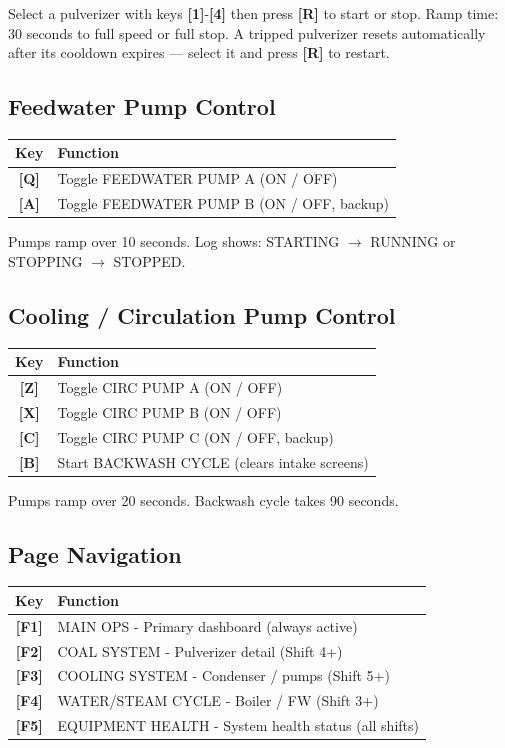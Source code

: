 \documentclass[10pt,a5paper]{article}
\newcommand{\key}[1]{\textbf{[#1]}}
\begin{document}
Select a pulverizer with keys \key{1}-\key{4} then press \key{R} to start or stop.
Ramp time: 30 seconds to full speed or full stop. A tripped pulverizer resets
automatically after its cooldown expires --- select it and press \key{R} to restart.

\subsection{Feedwater Pump Control}

\begin{center}
\begin{tabular}{cl}
\toprule
\textbf{Key} & \textbf{Function} \\
\midrule
\key{Q} & Toggle FEEDWATER PUMP A (ON / OFF) \\
\key{A} & Toggle FEEDWATER PUMP B (ON / OFF, backup) \\
\bottomrule
\end{tabular}
\end{center}

Pumps ramp over 10 seconds. Log shows: STARTING $\to$ RUNNING or STOPPING $\to$ STOPPED.

\subsection{Cooling / Circulation Pump Control}

\begin{center}
\begin{tabular}{cl}
\toprule
\textbf{Key} & \textbf{Function} \\
\midrule
\key{Z} & Toggle CIRC PUMP A (ON / OFF) \\
\key{X} & Toggle CIRC PUMP B (ON / OFF) \\
\key{C} & Toggle CIRC PUMP C (ON / OFF, backup) \\
\key{B} & Start BACKWASH CYCLE (clears intake screens) \\
\bottomrule
\end{tabular}
\end{center}

Pumps ramp over 20 seconds. Backwash cycle takes 90 seconds.

\subsection{Page Navigation}

\begin{center}
\begin{tabular}{cl}
\toprule
\textbf{Key} & \textbf{Function} \\
\midrule
\key{F1} & MAIN OPS - Primary dashboard (always active) \\
\key{F2} & COAL SYSTEM - Pulverizer detail (Shift 4+) \\
\key{F3} & COOLING SYSTEM - Condenser / pumps (Shift 5+) \\
\key{F4} & WATER/STEAM CYCLE - Boiler / FW (Shift 3+) \\
\key{F5} & EQUIPMENT HEALTH - System health status (all shifts) \\
\bottomrule
\end{tabular}
\end{center}
\end{document}

